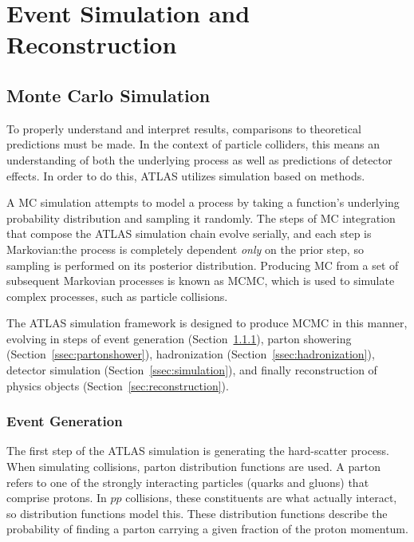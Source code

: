 \chapter{Event Simulation and Reconstruction}\label{ch:eventreco}


\section{Monte Carlo Simulation}\label{sec:simulation}

To properly understand and interpret results, comparisons to theoretical predictions must be made. In the context of particle colliders, this means an understanding of both the underlying process as well as predictions of detector effects. In order to do this, ATLAS utilizes simulation based on  methods. 

A \gls{MC} simulation attempts to model a process by taking a function's underlying probability distribution and sampling it randomly. The steps of \gls{MC} integration that compose the ATLAS simulation chain evolve serially, and each step is Markovian:\@ the process is completely dependent \textit{only} on the prior step, so sampling is performed on its posterior distribution. Producing \gls{MC} from a set of subsequent Markovian processes is known as \gls{MCMC}, which is used to simulate complex processes, such as particle collisions.

The ATLAS simulation framework is designed to produce \gls{MCMC} in this manner, evolving in steps of event generation (Section~\ref{ssec:eventgen}), parton showering (Section~\ref{ssec:partonshower}), hadronization (Section~\ref{ssec:hadronization}), detector simulation (Section~\ref{ssec:simulation}), and finally reconstruction of physics objects (Section~\ref{sec:reconstruction}).

\subsection{Event Generation}\label{ssec:eventgen}
The first step of the ATLAS simulation is generating the hard-scatter process. When simulating collisions, parton distribution functions are used. A parton refers to one of the strongly interacting particles (quarks and gluons) that comprise protons. In $pp$ collisions, these constituents are what actually interact, so distribution functions model this. These distribution functions describe the probability of finding a parton carrying a given fraction of the proton momentum. 

